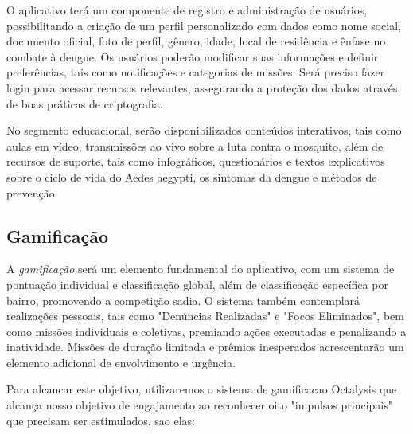 \documentclass[a5paper, 12pt]{article}
\begin{document}
O aplicativo terá um componente de registro e administração de usuários, possibilitando a criação de um perfil personalizado com dados como nome social, documento oficial, foto de perfil, gênero, idade, local de residência e ênfase no combate à dengue. Os usuários poderão modificar suas informações e definir preferências, tais como notificações e categorias de missões. Será preciso fazer login para acessar recursos relevantes, assegurando a proteção dos dados através de boas práticas de criptografia.

No segmento educacional, serão disponibilizados conteúdos interativos, tais como aulas em vídeo, transmissões ao vivo sobre a luta contra o mosquito, além de recursos de suporte, tais como infográficos, questionários e textos explicativos sobre o ciclo de vida do Aedes aegypti, os sintomas da dengue e métodos de prevenção.

\subsection{Gamificação}
\label{sec:game}
A \textit{gamificação} será um elemento fundamental do aplicativo, com um sistema de pontuação individual e classificação global, além de classificação específica por bairro, promovendo a competição sadia. O sistema também contemplará realizações pessoais, tais como "Denúncias Realizadas" e "Focos Eliminados", bem como missões individuais e coletivas, premiando ações executadas e penalizando a inatividade. Missões de duração limitada e prêmios inesperados acrescentarão um elemento adicional de envolvimento e urgência.

Para alcancar este objetivo, utilizaremos o sistema de gamificacao Octalysis que alcança nosso objetivo de engajamento ao reconhecer oito "impulsos principais" que precisam ser estimulados, sao elas:
\end{document}
